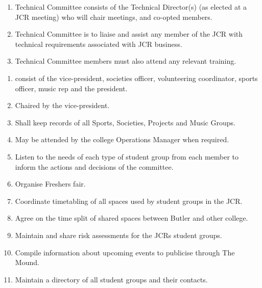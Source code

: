 
\begin{enumerate}
    \item Technical Committee consists of the Technical Director(s) (as elected at a JCR meeting) who will chair meetings, and co-opted members.
    \item Technical Committee is to liaise and assist any member of the JCR with technical requirements associated with JCR business.
    \item Technical Committee members must also attend any relevant training.
\end{enumerate}


\begin{enumerate}
    \item consist of the vice-president, societies officer, volunteering coordinator, sports officer, music rep and the president. 
    \item Chaired by the vice-president.
    \item Shall keep records of all Sports, Societies, Projects and Music Groups.
    \item May be attended by the college Operations Manager when required. 
    \item Listen to the needs of each type of student group from each member to inform the actions and decisions of the committee. 
    \item Organise Freshers fair.
    \item Coordinate timetabling of all spaces used by student groups in the JCR.
    \item Agree on the time split of shared spaces between Butler and other college. 
    \item Maintain and share risk assessments for the JCRs student groups.
    \item Compile information about upcoming events to publicise through The Mound.  
    \item Maintain a directory of all student groups and their contacts.
    
\end{enumerate}


